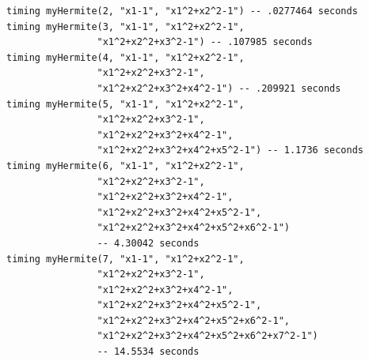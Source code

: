 \documentclass{amsart}
\begin{document}
\begin{lstlisting}[language = Macaulay2]
timing myHermite(2, "x1-1", "x1^2+x2^2-1") -- .0277464 seconds
timing myHermite(3, "x1-1", "x1^2+x2^2-1", 
				"x1^2+x2^2+x3^2-1") -- .107985 seconds
timing myHermite(4, "x1-1", "x1^2+x2^2-1", 
				"x1^2+x2^2+x3^2-1", 
				"x1^2+x2^2+x3^2+x4^2-1") -- .209921 seconds
timing myHermite(5, "x1-1", "x1^2+x2^2-1", 
				"x1^2+x2^2+x3^2-1", 
				"x1^2+x2^2+x3^2+x4^2-1", 
				"x1^2+x2^2+x3^2+x4^2+x5^2-1") -- 1.1736 seconds
timing myHermite(6, "x1-1", "x1^2+x2^2-1", 
				"x1^2+x2^2+x3^2-1", 
				"x1^2+x2^2+x3^2+x4^2-1", 
				"x1^2+x2^2+x3^2+x4^2+x5^2-1", 
				"x1^2+x2^2+x3^2+x4^2+x5^2+x6^2-1") 
                -- 4.30042 seconds
timing myHermite(7, "x1-1", "x1^2+x2^2-1", 
				"x1^2+x2^2+x3^2-1", 
				"x1^2+x2^2+x3^2+x4^2-1", 
				"x1^2+x2^2+x3^2+x4^2+x5^2-1", 
				"x1^2+x2^2+x3^2+x4^2+x5^2+x6^2-1", 
				"x1^2+x2^2+x3^2+x4^2+x5^2+x6^2+x7^2-1") 
                -- 14.5534 seconds
\end{lstlisting}

 
 
\end{document}

